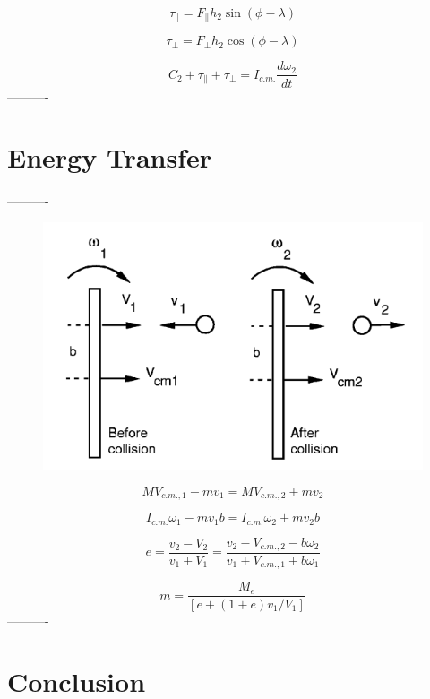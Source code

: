 \documentclass[%
 aip,
 amsmath,amssymb,
 reprint,%
 floatfix,%
]{revtex4-1}
\begin{document}
\begin{equation}
	\tau_{\parallel} = F_{\parallel} h_2 \sin{(\phi - \lambda)}
\end{equation}

\begin{equation}
	\tau_{\perp} = F_{\perp} h_2 \cos{(\phi - \lambda)}
\end{equation}

\begin{equation}
	C_2 + \tau_{\parallel} + \tau_{\perp} = I_{c.m.} \frac{d \omega_2}{dt}
\end{equation}
----------

\section{\label{sec:level5}Energy Transfer}

----------

\begin{figure}
	\centering
	\includegraphics[scale=0.4]{momentumtransfer.png}
	\caption{}
\end{figure}

\begin{equation}
	M V_{c.m.,1} - mv_1 = M V_{c.m.,2} + mv_2
\end{equation}

\begin{equation}
	I_{c.m.} \omega_1 - mv_1b=I_{c.m.} \omega_2 + mv_2b
\end{equation}

\begin{equation}
	e=\frac{v_2 - V_2}{v_1 + V_1} = \frac{v_2 - V_{c.m.,2} - b \omega_2}{v_1 + V_{c.m.,1} + b \omega_1}
\end{equation}

\begin{equation}
	m= \frac{M_e}{[e+(1+e)v_1/V_1]}
\end{equation}
----------

\section{\label{sec:level6}Conclusion}

\nocite{*}
\end{document}
